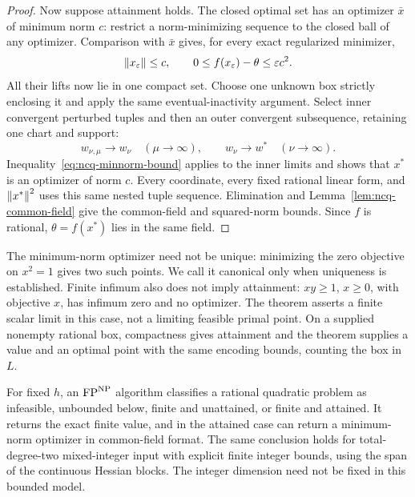\begin{proof}
Now suppose attainment holds. The closed optimal set has an optimizer
$\bar x$ of minimum norm $c$: restrict a norm-minimizing sequence to
the closed ball of any optimizer. Comparison with $\bar x$ gives, for
every exact regularized minimizer,
\begin{equation}
\label{eq:ncq-minnorm-bound}
 \left\lVert x_\varepsilon\right\rVert\le c,\qquad
 0\le f(x_\varepsilon)-\theta\le\varepsilon c^2.
\end{equation}
All their lifts now lie in one compact set. Choose one unknown box
strictly enclosing it and apply the same eventual-inactivity argument.
Select inner convergent perturbed tuples and then an outer convergent
subsequence, retaining one chart and support:
\[
 w_{\nu,\mu}\longrightarrow w_\nu\quad(\mu\to\infty),
 \qquad w_\nu\longrightarrow w^*\quad(\nu\to\infty).
\]
Inequality~\eqref{eq:ncq-minnorm-bound} applies to the inner limits and
shows that $x^*$ is an optimizer of norm $c$. Every coordinate, every
fixed rational linear form, and $\left\lVert x^*\right\rVert^2$ uses this same nested
tuple sequence. Elimination and Lemma~\ref{lem:ncq-common-field} give
the common-field and squared-norm bounds. Since $f$ is rational,
$\theta=f(x^*)$ lies in the same field.
\end{proof}

The minimum-norm optimizer need not be unique: minimizing the zero
objective on $x^2=1$ gives two such points. We call it canonical only when
uniqueness is established. Finite infimum also does not imply attainment:
$xy\ge1$, $x\ge0$, with objective $x$, has infimum zero and no optimizer.
The theorem asserts a finite scalar limit in this case, not a limiting
feasible primal point. On a supplied nonempty rational box, compactness
gives attainment and the theorem supplies a value and an optimal point
with the same encoding bounds, counting the box in $L$.

\begin{theorem}
\label{thm:ncq-oracle}
For fixed $h$, an $\mathrm{FP}^{\mathrm{NP}}$ algorithm classifies a rational
quadratic problem as infeasible, unbounded below, finite and unattained,
or finite and attained. It returns the exact finite value, and in the
attained case can return a minimum-norm optimizer in common-field format.
The same conclusion holds for total-degree-two mixed-integer input with
explicit finite integer bounds, using the span of the continuous Hessian
blocks. The integer dimension need not be fixed in this bounded model.
\end{theorem}

